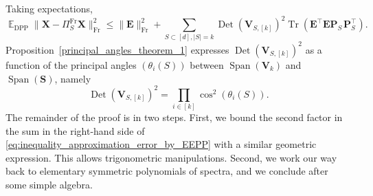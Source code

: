 \documentclass[twoside,11pt]{book}
\numberwithin{theorem}{chapter}
\numberwithin{definition}{chapter}
\numberwithin{proposition}{chapter}
\numberwithin{corollary}{chapter}
\numberwithin{example}{chapter}
\numberwithin{lemma}{chapter}
\numberwithin{assumption}{chapter}
\DeclareMathOperator{\Tr}{Tr}
\DeclareMathOperator{\Det}{Det}
\DeclareMathOperator{\Span}{\mathrm{Span}}
\DeclareMathOperator{\Fr}{\mathrm{Fr}}
\DeclareMathOperator{\DPP}{\mathrm{DPP}}
\DeclareMathOperator{\Tran}{\intercal}
\DeclareMathOperator{\EX}{\mathbb{E}}
\begin{document}
Taking expectations,
\begin{equation}
  \label{eq:inequality_approximation_error_by_EEPP}
		\EX_{\DPP} \| \bm{X} - \Pi_{S}^{\Fr}\bm{X} \|_{\Fr}^{2} \leq \|\bm{E}\|_{\Fr}^{2} + \sum_{S \subset [d], |S| = k}	\Det(\bm{V}_{S,[k]})^{2} \Tr(\bm{E}^{\Tran}\bm{E}\bm{P}^{\phantom{\Tran}}_{S}\bm{P}^{\Tran}_{S}).
\end{equation}
Proposition~\ref{principal_angles_theorem_1} expresses $\Det(\bm{V}_{S,[k]})^{2}$ as a function of the principal angles $(\theta_i(S))$ between $\Span(\bm{V}_k)$ and $\Span(\bm{S})$, namely
\begin{equation}\label{eq:det_cos_identity}
	\Det(\bm{V}_{S,[k]})^{2} = \prod\limits_{i \in [k]} \cos^{2}(\theta_{i}(S)).
\end{equation}
 The remainder of the proof is in two steps. First, we bound the second factor in the sum in the right-hand side of \eqref{eq:inequality_approximation_error_by_EEPP} with a similar geometric expression. This allows trigonometric manipulations. Second, we work our way back to elementary symmetric polynomials of spectra, and we conclude after some simple algebra.
\end{document}

